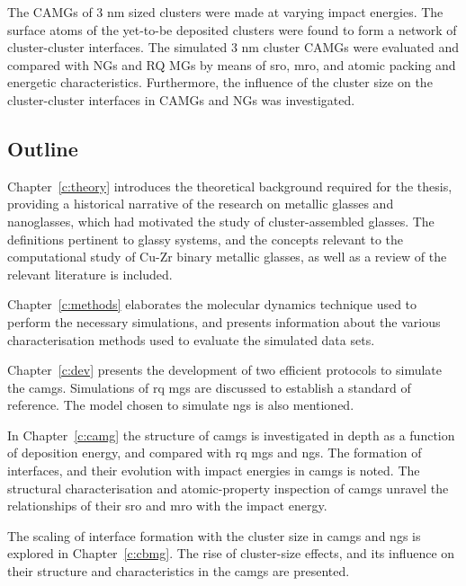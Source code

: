 The CAMGs of 3 nm sized \cz clusters were made at varying impact energies. The surface atoms of the yet-to-be deposited clusters were found to form a network of cluster-cluster interfaces. The simulated 3 nm cluster CAMGs were evaluated and compared with NGs and RQ MGs by means of \gls{sro}, \gls{mro}, and atomic packing and energetic characteristics. Furthermore, the influence of the cluster size on the cluster-cluster interfaces in CAMGs and NGs was investigated.

\subsection{Outline}
Chapter~\ref{c:theory} introduces the theoretical background required for the thesis, providing a historical narrative of the research on metallic glasses and nanoglasses, which had motivated the study of cluster-assembled glasses. The definitions pertinent to glassy systems, and the concepts relevant to the computational study of Cu-Zr binary metallic glasses, as well as a review of the relevant literature is included. \par

Chapter~\ref{c:methods} elaborates the molecular dynamics technique used to perform the necessary simulations, and presents information about the various characterisation methods used to evaluate the simulated data sets. \par 

Chapter~\ref{c:dev} presents the development of two efficient protocols to simulate the \glspl{camg}. Simulations of \gls{rq} \glspl{mg} are discussed to establish a standard of reference. The model chosen to simulate \gls{ng}s is also mentioned. \par 

In Chapter~\ref{c:camg} the structure of \gls{camg}s is investigated in depth as a function of deposition energy, and compared with \gls{rq} \gls{mg}s and \gls{ng}s. The formation of interfaces, and their evolution with impact energies in \gls{camg}s is noted. The structural characterisation and atomic-property inspection of \gls{camg}s unravel the relationships of their 
\gls{sro} and \gls{mro} with the impact energy. \par

The scaling of interface formation with the cluster size in \gls{camg}s and \gls{ng}s is explored in Chapter~\ref{c:cbmg}. The rise of cluster-size effects, and its influence on their structure and characteristics in the \gls{camg}s are presented. \par

